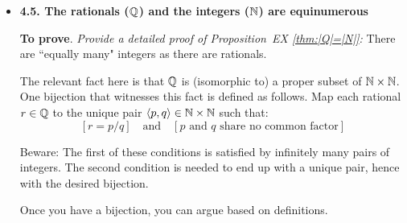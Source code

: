
\begin{itemize}
\item
{\bf 4.5. The rationals ($\mathbb{Q}$) and the integers ($\mathbb{N}$) are equinumerous}
\smallskip

{\bf To prove}. {\em Provide a {\em detailed} proof of Proposition~EX \ref{thm:|Q|=|N|}:} 
There are ``equally many" integers as there are rationals.

\smallskip

The relevant fact here is that $\mathbb{Q}$ is (isomorphic to) a proper subset of $\mathbb{N} \times \mathbb{N}$.  One bijection that witnesses this fact is defined as follows.  Map each rational $r \in \mathbb{Q}$ to the unique pair $\langle p,q \rangle \in \mathbb{N} \times \mathbb{N}$ such that:
\[ [r = p/q] \ \ \  \mbox{ and } \ \ \  [\mbox{$p$ and $q$ share no common factor}] \]

\smallskip

Beware: The first of these conditions is satisfied by infinitely many pairs of integers.  The second condition is needed to end up with a unique pair, hence with the desired bijection.

\smallskip

Once you have a bijection, you can argue based on definitions.
\end{itemize}


